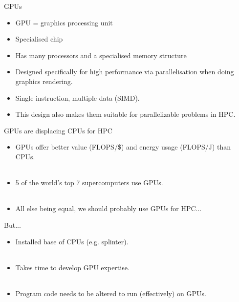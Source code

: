 \documentclass[usenames,dvipsnames]{beamer}
\begin{document}
\begin{frame}{GPUs}
  \begin{block}{}
    \begin{itemize}
      \item{GPU  = graphics processing unit}
      \item{Specialised chip}
      \item{Has many processors and a specialised memory structure}
      \item{Designed specifically for high performance via parallelisation when doing graphics rendering.}
      \item{Single instruction, multiple data (SIMD).}
      \item{This design also makes them suitable for parallelizable problems in HPC.}
    \end{itemize}
  \end{block}
\end{frame}

\begin{frame}{GPUs are displacing CPUs for HPC}
  \begin{block}{}
    \begin{itemize}
      \item{GPUs offer better value (FLOPS/\$) and energy usage (FLOPS/J) than CPUs.}\\~\
      \item{5 of the world's top 7 supercomputers use GPUs.\footnotemark}\\~\
      \item{All else being equal, we should probably use GPUs for HPC...}
    \end{itemize}
  \end{block}
\footnotetext[\value{footnote}]{As of June 2018}
\end{frame}

\begin{frame}{But...}
  \begin{block}{}
    \begin{itemize}
      \item{Installed base of CPUs (e.g. splinter).}\\~\
      \item{Takes time to develop GPU expertise.}\\~\
      \item{Program code needs to be altered to run (effectively) on GPUs.}
    \end{itemize}
  \end{block}
\end{frame}
\end{document}
